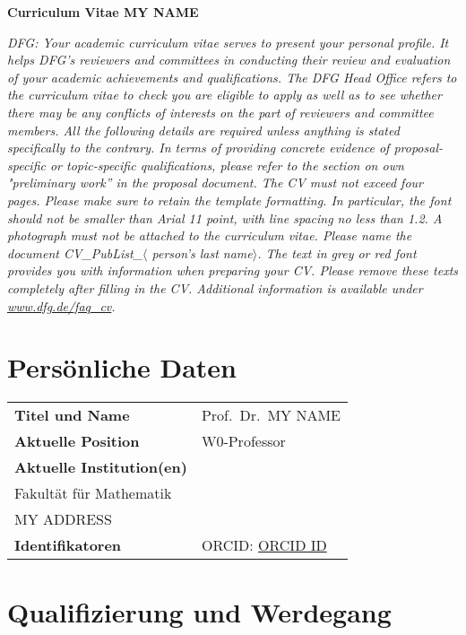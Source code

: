 \documentclass[a4paper,11pt]{article}
\def\mytitle{Prof.\ Dr.\ }
\def\myname{MY NAME}
\def\myinstitute{\begin{minipage}[t]{8cm}
    MY UNIVERSITY\\
    Fakultät für Mathematik\\
    MY ADDRESS
    \end{minipage}\vspace{.3ex}}
\def\myORCID{\href{https://orcid.org/0000-0002-9271-8436}{ORCID ID}} %
\def\myidentifier{ORCID: \myORCID}
\def\myposition{W0-Professor}
\begin{document}



\thispagestyle{empty}

\mbox{}
\vspace{-9ex}

\centerline{\Large \bf Curriculum Vitae \myname}
\emph{DFG: Your academic curriculum vitae serves to present your personal profile. It helps DFG’s reviewers and committees in conducting their review and evaluation of your academic achievements and qualifications. The DFG Head Office refers to the curriculum vitae to check you are eligible to apply as well as to see whether there may be any conflicts of interests on the part of reviewers and committee members. All the following details are required unless anything is stated specifically to the contrary.
In terms of providing concrete evidence of proposal-specific or topic-specific qualifications, please refer to the section on own "preliminary work” in the proposal document.
The CV must not exceed four pages. Please make sure to retain the template formatting. In particular, the font should not be smaller than Arial 11 point, with line spacing no less than 1.2. A photograph must not be attached to the curriculum vitae. Please 
name the document CV\_PubList\_$\langle$ person’s last name$\rangle$.
The text in grey or red font provides you with information when preparing your CV. Please remove these texts completely after filling in the CV.
Additional information is available under \url{www.dfg.de/faq_cv}.}
\section*{Persönliche Daten}

\noindent
\begin{tabularx}{\textwidth}{@{}ll}
  \textbf{Titel und Name} & \mytitle \myname \\
  \textbf{Aktuelle Position} & \myposition \\
  \textbf{Aktuelle Institution(en)} & \myinstitute \\
  \textbf{Identifikatoren} & \myidentifier
\end{tabularx}


\section*{Qualifizierung und Werdegang}
\end{document}
